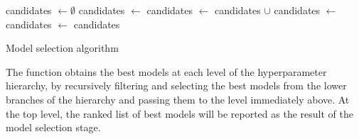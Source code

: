 \begin{algorithm}[here]
	\begin{algorithmic}
			\State candidates $\gets \emptyset$
				\State candidates $\gets$ 
			\Else
					\State candidates $\gets$ candidates $\cup$ 
				\EndFor
			\EndIf
			\State candidates $\gets$ 
			\State candidates $\gets$ 
			\State\Return candidates
		\EndFunction
	\end{algorithmic}
	\caption{Model selection algorithm}
	\label{alg:modelselection}
\end{algorithm}

The function obtains the best models at each level of the hyperparameter hierarchy, by recursively
filtering and selecting the best models from the lower branches of the hierarchy and passing them to
the level immediately above. At the top level, the ranked list of best models will be reported as
the result of the model selection stage.


